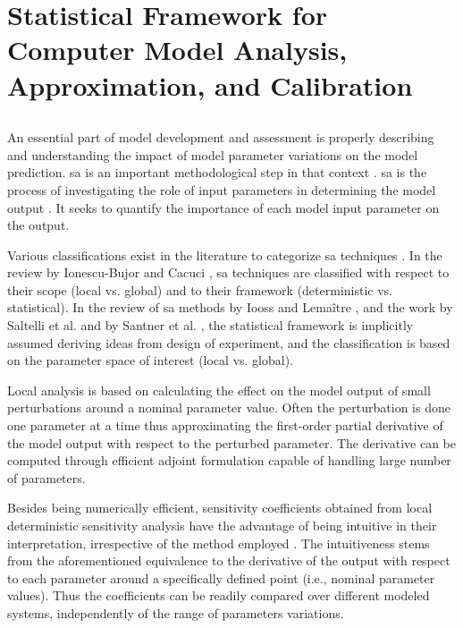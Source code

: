 \section[Statistical Framework]{Statistical Framework for Computer Model Analysis, Approximation, and Calibration}\label{sec:intro_statistical_framework}

\subsection{}

An essential part of model development and assessment is 
properly describing and understanding the impact of model parameter variations on the model prediction.
\Gls{sa} is an important methodological step in that context \cite{Trucano2006}.
\gls{sa} is the process of investigating the role of input parameters in determining the model output \cite{Iooss2015}. 
It seeks to quantify the importance of each model input parameter on the output.

Various classifications exist in the literature to categorize \gls{sa} techniques \cite{Frey2002, Ionescu-Bujor2004, Cacuci2004, Saltelli2008, Iooss2015}.
In the review by Ionescu-Bujor and Cacuci \cite{Ionescu-Bujor2004, Cacuci2004}, 
\gls{sa} techniques are classified with respect to their scope (local vs. global) and to their framework (deterministic vs. statistical).
In the review of \gls{sa} methods by Iooss and Lemaître \cite{Iooss2015}, 
and the work by Saltelli et al. \cite{Saltelli2008} and by Santner et al. \cite{Santner2003}, 
the statistical framework is implicitly assumed deriving ideas from design of experiment, 
and the classification is based on the parameter space of interest (local vs. global).

Local analysis is based on calculating the effect on the model output of small perturbations around a nominal parameter value. 
Often the perturbation is done one parameter at a time thus approximating the first-order partial derivative of the model output with respect to the perturbed parameter. 
The derivative can be computed through efficient adjoint formulation \cite{Cacuci2003,Cacuci2010} capable of handling large number of parameters.

Besides being numerically efficient, 
sensitivity coefficients obtained from local deterministic sensitivity analysis have the advantage of being intuitive in their interpretation, 
irrespective of the method employed \cite{Razavi2015}. 
The intuitiveness stems from the aforementioned equivalence to the derivative of the output with respect to each parameter \cite{Ionescu-Bujor2004} around a specifically defined point (i.e., nominal parameter values). 
Thus the coefficients can be readily compared over different modeled systems, 
independently of the range of parameters variations.

